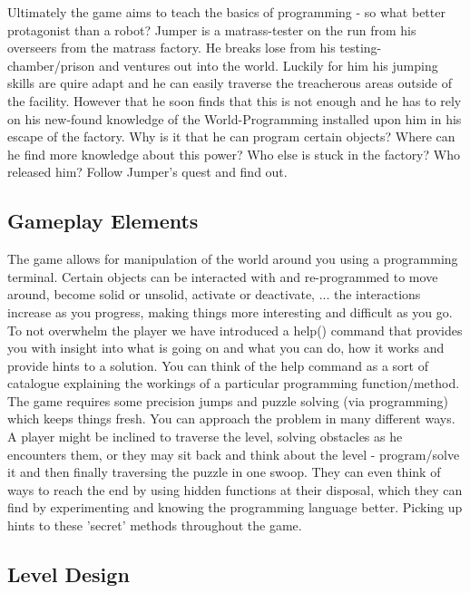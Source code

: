 \documentclass[a4paper,twoside,12pt]{article}
\begin{document}
Ultimately the game aims to teach the basics of programming - so what better protagonist than a robot?
Jumper is a matrass-tester on the run from his overseers from the matrass factory. He breaks lose from his testing-chamber/prison and ventures out into the world. Luckily for him his jumping skills are quire adapt and he can easily traverse the treacherous areas outside of the facility. However that he soon finds that this is not enough and he has to rely on his new-found knowledge of the World-Programming installed upon him in his escape of the factory. Why is it that he can program certain objects? Where can he find more knowledge about this power? Who else is stuck in the factory? Who released him? Follow Jumper's quest and find out.


\subsection{Gameplay Elements}
The game allows for manipulation of the world around you using a programming terminal. Certain objects can be interacted with and re-programmed to move around, become solid or unsolid, activate or deactivate, ...
the interactions increase as you progress, making things more interesting and difficult as you go. To not overwhelm the player we have introduced a help() command that provides you with insight into what is going on and what you can do, how it works and provide hints to a solution. You can think of the help command as a sort of catalogue explaining the workings of a particular programming function/method. The game requires some precision jumps and puzzle solving (via programming) which keeps things fresh. You can approach the problem in many different ways. A player might be inclined to traverse the level, solving obstacles as he encounters them, or they may sit back and think about the level - program/solve it and then finally traversing the puzzle in one swoop. They can even think of ways to reach the end by using hidden functions at their disposal, which they can find by experimenting and knowing the programming language better. Picking up hints to these 'secret' methods throughout the game.

\subsection{Level Design}
\end{document}
